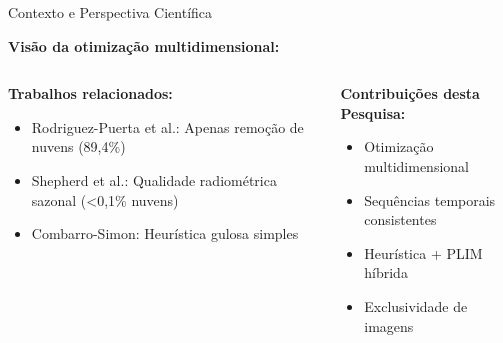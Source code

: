 \documentclass[aspectratio=169,11pt]{beamer}
\begin{document}
\begin{frame}{Contexto e Perspectiva Científica}
\vspace{-0.2cm}
\begin{center}
\textbf{Visão da otimização multidimensional:}
\end{center}

\begin{columns}[T]
    \begin{column}{0.48\textwidth}
        \textbf{\color{ufal}Trabalhos relacionados:}
        \begin{itemize}
            \item Rodriguez-Puerta et al\@.: Apenas remoção de nuvens (89,4\%)
            \item Shepherd et al\@.: Qualidade radiométrica sazonal (<0,1\% nuvens)
            \item Combarro-Simon: Heurística gulosa simples
        \end{itemize}
    \end{column}
    \begin{column}{0.48\textwidth}
        \textbf{\color{success}Contribuições desta Pesquisa:}
        \begin{itemize}
            \item Otimização multidimensional
            \item Sequências temporais consistentes
            \item Heurística + PLIM híbrida
            \item Exclusividade de imagens
        \end{itemize}
    \end{column}
\end{columns}
\end{frame}
\end{document}
